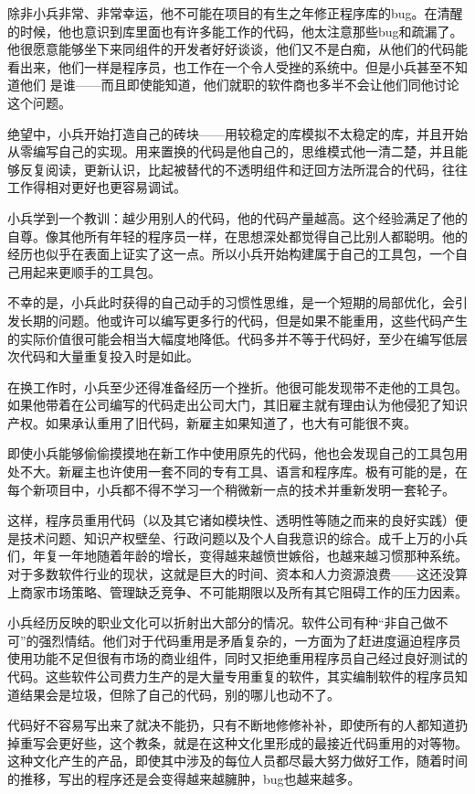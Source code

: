 \documentclass[12pt,oneside]{ctexbook}
\begin{document}
\begin{common-format}
除非小兵非常、非常幸运，他不可能在项目的有生之年修正程序库的bug。在清醒的时候，他也意识到库里面也有许多能工作的代码，他太注意那些bug和疏漏了。他很愿意能够坐下来同组件的开发者好好谈谈，他们又不是白痴，从他们的代码能看出来，他们一样是程序员，也工作在一个令人受挫的系统中。但是小兵甚至不知道他们
是谁——而且即使能知道，他们就职的软件商也多半不会让他们同他讨论这个问题。

绝望中，小兵开始打造自己的砖块——用较稳定的库模拟不太稳定的库，并且开始从零编写自己的实现。用来置换的代码是他自己的，思维模式他一清二楚，并且能够反复阅读，更新认识，比起被替代的不透明组件和迂回方法所混合的代码，往往工作得相对更好也更容易调试。

小兵学到一个教训：越少用别人的代码，他的代码产量越高。这个经验满足了他的自尊。像其他所有年轻的程序员一样，在思想深处都觉得自己比别人都聪明。他的经历也似乎在表面上证实了这一点。所以小兵开始构建属于自己的工具包，一个自己用起来更顺手的工具包。

不幸的是，小兵此时获得的自己动手的习惯性思维，是一个短期的局部优化，会引发长期的问题。他或许可以编写更多行的代码，但是如果不能重用，这些代码产生的实际价值很可能会相当大幅度地降低。代码多并不等于代码好，至少在编写低层次代码和大量重复投入时是如此。

在换工作时，小兵至少还得准备经历一个挫折。他很可能发现带不走他的工具包。如果他带着在公司编写的代码走出公司大门，其旧雇主就有理由认为他侵犯了知识产权。如果承认重用了旧代码，新雇主如果知道了，也大有可能很不爽。

即使小兵能够偷偷摸摸地在新工作中使用原先的代码，他也会发现自己的工具包用处不大。新雇主也许使用一套不同的专有工具、语言和程序库。极有可能的是，在每个新项目中，小兵都不得不学习一个稍微新一点的技术并重新发明一套轮子。

这样，程序员重用代码（以及其它诸如模块性、透明性等随之而来的良好实践）便是技术问题、知识产权壁垒、行政问题以及个人自我意识的综合。成千上万的小兵们，年复一年地随着年龄的增长，变得越来越愤世嫉俗，也越来越习惯那种系统。对于多数软件行业的现状，这就是巨大的时间、资本和人力资源浪费——这还没算上商家市场策略、管理缺乏竞争、不可能期限以及所有其它阻碍工作的压力因素。

小兵经历反映的职业文化可以折射出大部分的情况。软件公司有种“非自己做不可”的强烈情结。他们对于代码重用是矛盾复杂的，一方面为了赶进度逼迫程序员使用功能不足但很有市场的商业组件，同时又拒绝重用程序员自己经过良好测试的代码。这些软件公司费力生产的是大量专用重复的软件，其实编制软件的程序员知道结果会是垃圾，但除了自己的代码，别的哪儿也动不了。

代码好不容易写出来了就决不能扔，只有不断地修修补补，即使所有的人都知道扔掉重写会更好些，这个教条，就是在这种文化里形成的最接近代码重用的对等物。这种文化产生的产品，即使其中涉及的每位人员都尽最大努力做好工作，随着时间的推移，写出的程序还是会变得越来越臃肿，bug也越来越多。



\end{common-format}
\end{document}
